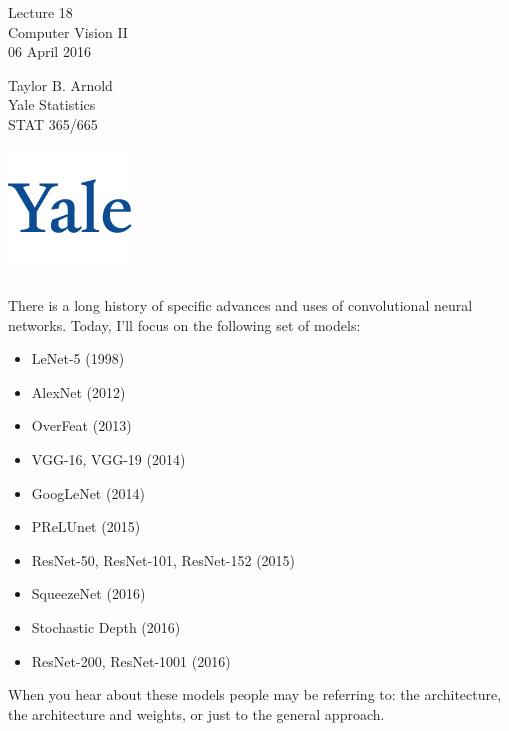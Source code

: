 \documentclass[xetex,mathserif,serif,aspectratio=169]{beamer}
\begin{document}
\begin{frame}[fragile] \frametitle{} \oldB \small

\vfill

{\fontsize{0.7cm}{0cm}\selectfont Lecture 18 \\\vspace{0.2cm}
Computer Vision II}\\\vspace{0.5cm}
06 April 2016

\vspace{2cm}

\begin{minipage}{0.6\textwidth}
Taylor B. Arnold \\
Yale Statistics \\
STAT 365/665
\end{minipage}
\hfill
\begin{minipage}{0.3\textwidth}\raggedleft
\includegraphics[scale=0.3]{../yale-logo.png}
\end{minipage}%

\end{frame}


\begin{frame}[fragile] \frametitle{} \oldB \footnotesize


There is a long history of specific advances and uses of convolutional
neural networks. Today, I'll focus on the following set of models: \vspace*{-0.5cm}
\begin{itemize}
\item LeNet-5 (1998)
\item AlexNet (2012)
\item OverFeat (2013)
\item VGG-16, VGG-19 (2014)
\item GoogLeNet (2014)
\item PReLUnet (2015)
\item ResNet-50, ResNet-101, ResNet-152 (2015)
\item SqueezeNet (2016)
\item Stochastic Depth (2016)
\item ResNet-200, ResNet-1001 (2016)
\end{itemize} \vspace*{-0.5cm}
When you hear about these models people may be referring to: the architecture,
the architecture and weights, or just to the general approach.

\end{frame}
\end{document}
